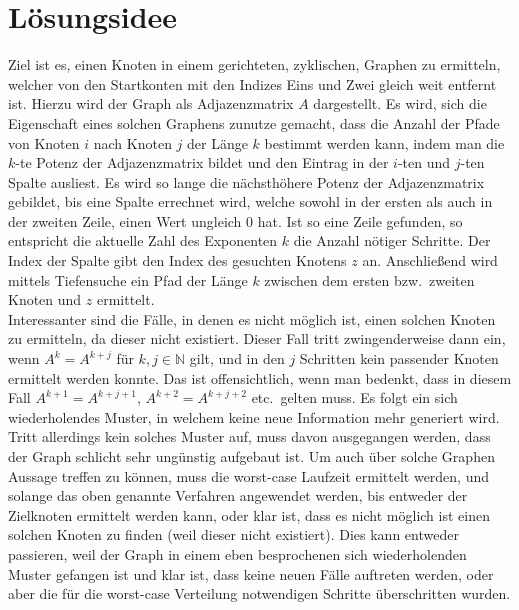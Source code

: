 \maketitle
\tableofcontents

\vspace{0.5cm}


\section{Lösungsidee}\label{sec:losungsidee}
Ziel ist es, einen Knoten in einem gerichteten, zyklischen,
Graphen zu ermitteln, welcher von den Startkonten mit
den Indizes Eins und Zwei gleich weit entfernt ist.
Hierzu wird der Graph als Adjazenzmatrix $A$ dargestellt.
Es wird, sich die Eigenschaft eines solchen Graphens zunutze gemacht, dass die Anzahl der Pfade von Knoten $i$
nach Knoten $j$ der Länge $k$ bestimmt werden kann, indem man die $k$-te
Potenz der Adjazenzmatrix bildet und den Eintrag in der $i$-ten und $j$-ten Spalte ausliest.
Es wird so lange die nächsthöhere Potenz der Adjazenzmatrix gebildet, bis eine Spalte errechnet wird, welche sowohl
in der ersten als auch in der zweiten Zeile, einen Wert ungleich 0 hat.
Ist so eine Zeile gefunden, so entspricht die aktuelle Zahl des Exponenten $k$ die Anzahl nötiger Schritte.
Der Index der Spalte gibt den Index des gesuchten Knotens $z$ an.
Anschließend wird mittels Tiefensuche ein Pfad der Länge $k$ zwischen dem ersten bzw.\ zweiten Knoten und $z$ ermittelt. \\
Interessanter sind die Fälle, in denen es nicht möglich ist, einen solchen Knoten zu ermitteln, da dieser nicht existiert.
Dieser Fall tritt zwingenderweise dann ein, wenn $A^k=A^{k + j}$ für $k,j\in\mathbb{N}$ gilt,
und in den $j$ Schritten kein passender Knoten ermittelt werden konnte.
Das ist offensichtlich, wenn man bedenkt, dass in diesem Fall  $A^{k + 1}=A^{k + j +1}$, $A^{k + 2}=A^{k + j + 2}$ etc.\ gelten muss.
Es folgt ein sich wiederholendes Muster, in welchem keine neue Information mehr generiert wird. \\
Tritt allerdings kein solches Muster auf, muss davon ausgegangen werden, dass der Graph schlicht sehr ungünstig aufgebaut ist.
Um auch über solche Graphen Aussage treffen zu können, muss die worst-case Laufzeit ermittelt werden, und solange das
oben genannte Verfahren angewendet werden, bis entweder der Zielknoten ermittelt werden kann, oder klar ist,
dass es nicht möglich ist einen solchen Knoten zu finden (weil dieser nicht existiert).
Dies kann entweder passieren, weil der Graph in einem eben besprochenen sich wiederholenden Muster gefangen ist und klar ist,
dass keine neuen Fälle auftreten werden, oder aber die für die worst-case Verteilung notwendigen Schritte überschritten wurden.


